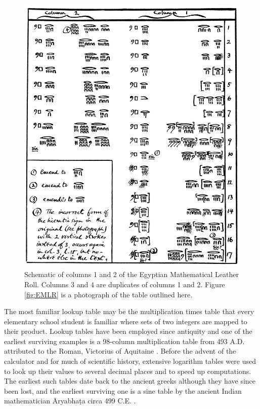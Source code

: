 \begin{figure}
  \centering
  \includegraphics[width=\textwidth]{gfx/EMLRschematic}
  \caption[Schematic of columns 1 and 2 of the Egyptian Mathematical Leather Roll.]
  {Schematic of columns 1 and 2 of the Egyptian Mathematical Leather Roll. Columns 3 and 4 are duplicates of columns 1 and 2. Figure \ref{fig:EMLR} is a photograph of the table outlined here.}
  \label{fig:EMLRschematic}
\end{figure}

The most familiar lookup table may be the multiplication times table that every elementary school student is familiar where sets of two integers are mapped to their product. Lookup tables have been employed since antiquity and one of the earliest surviving examples is a 98-column multiplication table from 493 A.D. attributed to the Roman, Victorius of Aquitaine \citep{Maher01}. Before the advent of the calculator and for much of scientific history, extensive logarithm tables were used to look up their values to several decimal places and to speed up computations. The earliest such tables date back to the ancient greeks although they have since been lost, and the earliest surviving one is a sine table by the ancient Indian mathematician \={A}ryabha\d{t}a circa 499 C.E. \citep{Hayashi97}.

